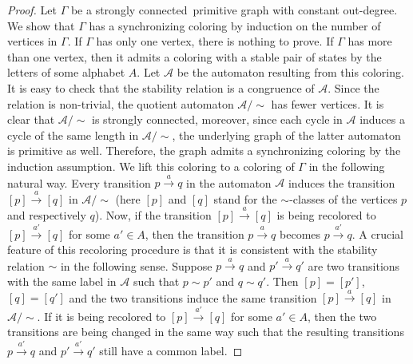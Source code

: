 \documentclass{irmaart}
\newcommand{\scn}{strongly connected}
\theoremstyle{plain}
\begin{document}
\begin{proof}
Let $\Gamma$ be a \scn\ primitive graph with constant out-degree. We show that
$\Gamma$ has a synchronizing coloring by induction on the number of vertices in
$\Gamma$. If $\Gamma$ has only one vertex, there is nothing to prove. If
$\Gamma$ has more than one vertex, then it admits a coloring with a stable pair
of states by the letters of some alphabet $A$. Let $\mathcal{A}$ be the
automaton resulting from this coloring. It is easy to check that the stability
relation is a congruence of $\mathcal{A}$. Since the relation is non-trivial,
the quotient automaton $\mathcal{A}/\!{\sim}$ has fewer vertices. It is clear
that $\mathcal{A}/\!{\sim}$ is \scn, moreover, since each cycle in
$\mathcal{A}$ induces a cycle of the same length in $\mathcal{A}/\!\sim$, the
underlying graph of the latter automaton is primitive as well. Therefore, the
graph admits a synchronizing coloring by the induction assumption. We lift this
coloring to a coloring of $\Gamma$ in the following natural way. Every
transition $p\xrightarrow{a}q$ in the automaton $\mathcal{A}$ induces the
transition $[p]\xrightarrow{a}[q]$ in $\mathcal{A}/\!{\sim}$ (here $[p]$ and
$[q]$ stand for the $\sim$-classes of the vertices $p$ and respectively $q$).
Now, if the transition $[p]\xrightarrow{a}[q]$ is being recolored to
$[p]\xrightarrow{a'}[q]$ for some $a'\in A$, then the transition
$p\xrightarrow{a}q$ becomes $p\xrightarrow{a'}q$. A crucial feature of this
recoloring procedure is that it is consistent with the stability relation
$\sim$ in the following sense. Suppose $p\xrightarrow{a}q$ and
$p'\xrightarrow{a}q'$ are two transitions with the same label in $\mathcal{A}$
such that $p\sim p'$ and $q\sim q'$. Then $[p]=[p']$, $[q]=[q']$ and the two
transitions induce the same transition $[p]\xrightarrow{a}[q]$ in
$\mathcal{A}/\!{\sim}$. If it is being recolored to $[p]\xrightarrow{a'}[q]$
for some $a'\in A$, then the two transitions are being changed in the same way
such that the resulting transitions $p\xrightarrow{a'}q$ and
$p'\xrightarrow{a'}q'$ still have a common label.


\end{proof}
\end{document}
